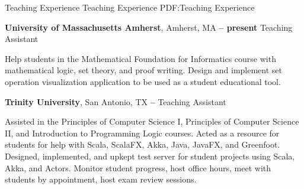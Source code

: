 \Section
{Teaching Experience}
{Teaching Experience}
{PDF:Teaching Experience}

\Entry
\textbf{University of Massachusetts Amherst},
Amherst, MA
\dotfill
\textbf{ -- present}
\Gap
Teaching Assistant
\begin{Detail}
    \SubBulletItem
    Help students in the Mathematical Foundation for Informatics course with mathematical logic, set theory, and proof writing.
    \SubBulletItem
    Design and implement set operation visualization application to be used as a student educational tool.
\end{Detail}

\BigGap
\Entry
\textbf{Trinity University},
San Antonio, TX
\dotfill
\textbf{ -- }
\Gap
Teaching Assistant
\begin{Detail}
    \SubBulletItem
    Assisted in the Principles of Computer Science I, Principles of Computer Science II, and Introduction to Programming Logic courses.
    \SubBulletItem
    Acted as a resource for students for help with Scala, ScalaFX, Akka, Java, JavaFX, and Greenfoot.
    \SubBulletItem
    Designed, implemented, and upkept test server for student projects using Scala, Akka, and Actors.
    \SubBulletItem
    Monitor student progress, host office hours, meet with students by appointment, host exam review sessions.
\end{Detail}
